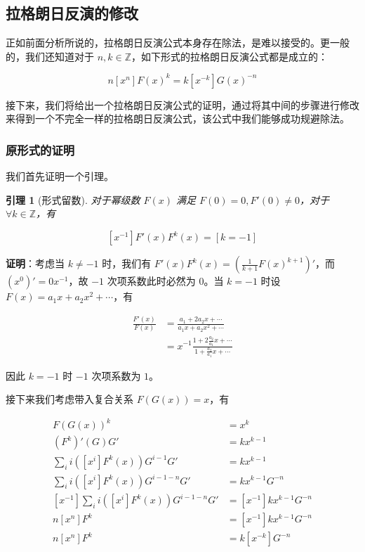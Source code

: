 \documentclass[12pt]{ctexart}
\newtheorem{Lem}{\hspace{2em}引理}
\begin{document}
\subsection{拉格朗日反演的修改}

正如前面分析所说的，拉格朗日反演公式本身存在除法，是难以接受的。更一般的，我们还知道对于 $n,k\in \mathbb Z$，如下形式的拉格朗日反演公式都是成立的：

$$
n[x^n]F(x)^k = k[x^{-k}]G(x)^{-n}
$$

接下来，我们将给出一个拉格朗日反演公式的证明，通过将其中间的步骤进行修改来得到一个不完全一样的拉格朗日反演公式，该公式中我们能够成功规避除法。

\subsubsection{原形式的证明}

我们首先证明一个引理。

\begin{Lem}[形式留数]
对于幂级数 $F(x)$ 满足 $F(0)=0, F'(0)\neq0$，对于 $\forall k\in \mathbb Z$，有

$$
[x^{-1}]F'(x)F^k(x)=[k=-1]
$$

\end{Lem}

\textbf{证明}：考虑当 $k\neq -1$ 时，我们有 $F'(x)F^k(x)=(\frac 1{k+1} F(x)^{k+1})'$，而 $(x^0)'=0x^{-1}$，故 $-1$ 次项系数此时必然为 $0$。当 $k=-1$ 时设 $F(x) = a_1 x + a_2 x^2 + \cdots$，有

\begin{align*}
\frac{F'(x)}{F(x)} &= \frac{a_1 + 2a_2x + \cdots}{a_1 x + a_2 x^2 + \cdots}\\
&= x^{-1} \frac{1 + 2\frac{a_2}{a_1} x + \cdots}{1 + \frac{a_2}{a_1} x + \cdots}
\end{align*}

因此 $k=-1$ 时 $-1$ 次项系数为 $1$。

接下来我们考虑带入复合关系 $F(G(x))=x$，有

\begin{align*}
F(G(x))^k &= x^k\\
(F^k)'(G)G' &= kx^{k-1}\\
\sum_{i} i([x^i] F^k(x)) G^{i-1}G' &= kx^{k-1}\\
\sum_{i} i([x^i] F^k(x)) G^{i-1-n}G' &= kx^{k-1}G^{-n}\\ 
[x^{-1}]\sum_{i} i([x^i] F^k(x)) G^{i-1-n}G' &= [x^{-1}]kx^{k-1}G^{-n}\\ 
n[x^n] F^k &= [x^{-1}]kx^{k-1}G^{-n}\\ 
n[x^n] F^k &= k[x^{-k}]G^{-n}
\end{align*}
\end{document}

